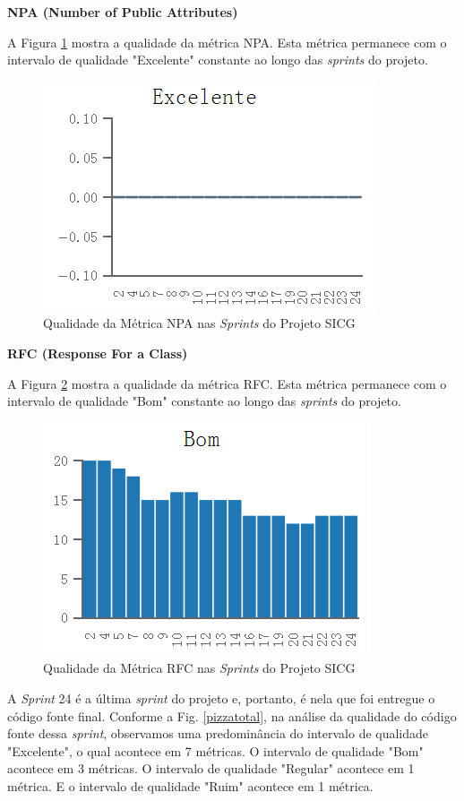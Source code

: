 \textbf{NPA (Number of Public Attributes)} 

A Figura \ref{npa} mostra a qualidade da métrica NPA. Esta métrica permanece com o intervalo de qualidade "Excelente" constante ao longo das \textit{sprints} do projeto.

\begin{figure}[H]
		\centering
			\includegraphics[scale=1.0]{figuras/npa.png}
		\caption{Qualidade da Métrica NPA nas \textit{Sprints} do Projeto SICG}
		\label{npa}
\end{figure}

\textbf{RFC (Response For a Class)} 

A Figura \ref{rfc} mostra a qualidade da métrica RFC. Esta métrica permanece com o intervalo de qualidade "Bom" constante ao longo das \textit{sprints} do projeto.

\begin{figure}[H]
		\centering
			\includegraphics[scale=1.0]{figuras/rfc.png}
		\caption{Qualidade da Métrica RFC nas \textit{Sprints} do Projeto SICG}
		\label{rfc}
\end{figure}

A \textit{Sprint} 24 é a última \textit{sprint} do projeto e, portanto, é nela que foi entregue o código fonte final. Conforme a Fig. \ref{pizzatotal}, na análise da qualidade do código fonte dessa \textit{sprint}, observamos uma predominância do intervalo de qualidade "Excelente", o qual acontece em 7 métricas. O intervalo de qualidade "Bom" acontece em 3 métricas. O intervalo de qualidade "Regular" acontece em 1 métrica. E o intervalo de qualidade "Ruim" acontece em 1 métrica.

